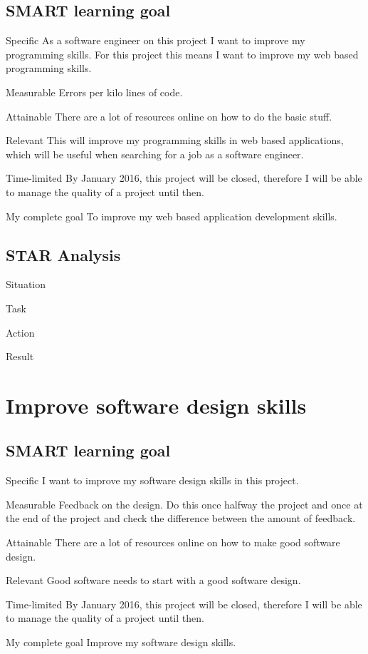 \documentclass[12pt]{article}
\begin{document}
	\subsection{SMART learning goal}
	\begin{SMART}
	    \item[Specific] As a software engineer on this project I want to improve my programming skills. For this project this means I want to improve 
	    my web based programming skills.
	    \item[Measurable] Errors per kilo lines of code.
	    \item[Attainable] There are a lot of resources online on how to do the basic stuff.
	    \item[Relevant] This will improve my programming skills in web based applications, which will be useful when searching for a job as a software engineer.
	    \item[Time-limited]By January 2016, this project will be closed, therefore I will be able to manage the quality of a project until then.
	    \item[My complete goal] To improve my web based application development skills.
	\end{SMART}
	
	\subsection{STAR Analysis}
	\begin{STAR}
	    \item[Situation]
	    \item[Task]
	    \item[Action]
	    \item[Result]
	\end{STAR}
	
	\section{Improve software design skills}
	\subsection{SMART learning goal}
	\begin{SMART}
	    \item[Specific] I want to improve my software design skills in this project.
	    \item[Measurable] Feedback on the design. Do this once halfway the project and once at the end of the project and check the difference between the amount of feedback.
	    \item[Attainable] There are a lot of resources online on how to make good software design.
	    \item[Relevant] Good software needs to start with a good software design.
	    \item[Time-limited] By January 2016, this project will be closed, therefore I will be able to manage the quality of a project until then.
	    \item[My complete goal] Improve my software design skills.
	\end{SMART}
	
\end{document}
